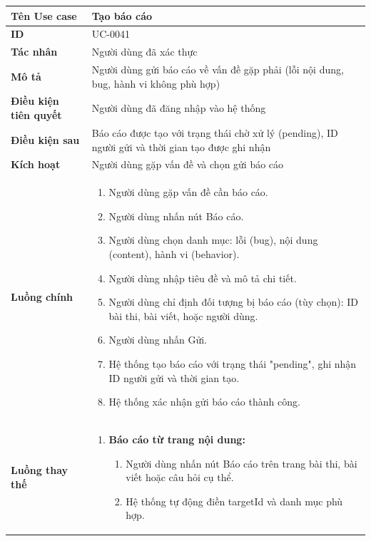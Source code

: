 {
\renewcommand{\arraystretch}{1.5}

\begin{tabularx}{\textwidth}{|>{\raggedright\arraybackslash}X|>{\raggedright\arraybackslash}X|}
\hline
\textbf{Tên Use case} & Tạo báo cáo \\
\hline
\textbf{ID} & UC-0041 \\
\hline
\textbf{Tác nhân} & Người dùng đã xác thực \\
\hline
\textbf{Mô tả} & Người dùng gửi báo cáo về vấn đề gặp phải (lỗi nội dung, bug, hành vi không phù hợp) \\
\hline
\textbf{Điều kiện tiên quyết} & Người dùng đã đăng nhập vào hệ thống \\
\hline
\textbf{Điều kiện sau} & Báo cáo được tạo với trạng thái chờ xử lý (pending), ID người gửi và thời gian tạo được ghi nhận \\
\hline
\textbf{Kích hoạt} & Người dùng gặp vấn đề và chọn gửi báo cáo \\
\hline
\textbf{Luồng chính} &
\begin{enumerate}
    \item Người dùng gặp vấn đề cần báo cáo.
    \item Người dùng nhấn nút Báo cáo.
    \item Người dùng chọn danh mục: lỗi (bug), nội dung (content), hành vi (behavior).
    \item Người dùng nhập tiêu đề và mô tả chi tiết.
    \item Người dùng chỉ định đối tượng bị báo cáo (tùy chọn): ID bài thi, bài viết, hoặc người dùng.
    \item Người dùng nhấn Gửi.
    \item Hệ thống tạo báo cáo với trạng thái "pending", ghi nhận ID người gửi và thời gian tạo.
    \item Hệ thống xác nhận gửi báo cáo thành công.
\end{enumerate} \\
\hline
\textbf{Luồng thay thế} &
\begin{enumerate}
    \item \textbf{Báo cáo từ trang nội dung:}
    \begin{enumerate}
        \item[2A.] Người dùng nhấn nút Báo cáo trên trang bài thi, bài viết hoặc câu hỏi cụ thể.
        \item[3A.] Hệ thống tự động điền targetId và danh mục phù hợp.
    \end{enumerate}

\end{enumerate}
\end{tabularx}}

